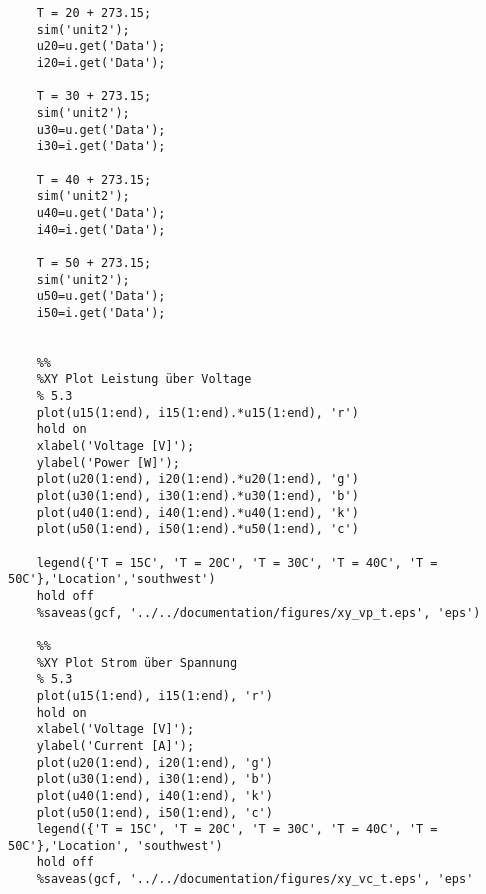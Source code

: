 \begin{appendices}
\begin{lstlisting}
	T = 20 + 273.15;
	sim('unit2');
	u20=u.get('Data');
	i20=i.get('Data');
	
	T = 30 + 273.15;
	sim('unit2');
	u30=u.get('Data');
	i30=i.get('Data');
	
	T = 40 + 273.15;
	sim('unit2');
	u40=u.get('Data');
	i40=i.get('Data');
	
	T = 50 + 273.15;
	sim('unit2');
	u50=u.get('Data');
	i50=i.get('Data');
	
		
	%%
	%XY Plot Leistung über Voltage
	% 5.3
	plot(u15(1:end), i15(1:end).*u15(1:end), 'r')
	hold on
	xlabel('Voltage [V]');
	ylabel('Power [W]');
	plot(u20(1:end), i20(1:end).*u20(1:end), 'g')
	plot(u30(1:end), i30(1:end).*u30(1:end), 'b')
	plot(u40(1:end), i40(1:end).*u40(1:end), 'k')
	plot(u50(1:end), i50(1:end).*u50(1:end), 'c')

	legend({'T = 15C', 'T = 20C', 'T = 30C', 'T = 40C', 'T = 50C'},'Location','southwest')
	hold off
	%saveas(gcf, '../../documentation/figures/xy_vp_t.eps', 'eps')
	
	%%
	%XY Plot Strom über Spannung
	% 5.3
	plot(u15(1:end), i15(1:end), 'r')
	hold on
	xlabel('Voltage [V]');
	ylabel('Current [A]');
	plot(u20(1:end), i20(1:end), 'g')
	plot(u30(1:end), i30(1:end), 'b')
	plot(u40(1:end), i40(1:end), 'k')
	plot(u50(1:end), i50(1:end), 'c')
	legend({'T = 15C', 'T = 20C', 'T = 30C', 'T = 40C', 'T = 50C'},'Location', 'southwest')
	hold off
	%saveas(gcf, '../../documentation/figures/xy_vc_t.eps', 'eps'	
\end{lstlisting}
	
	
\end{appendices}